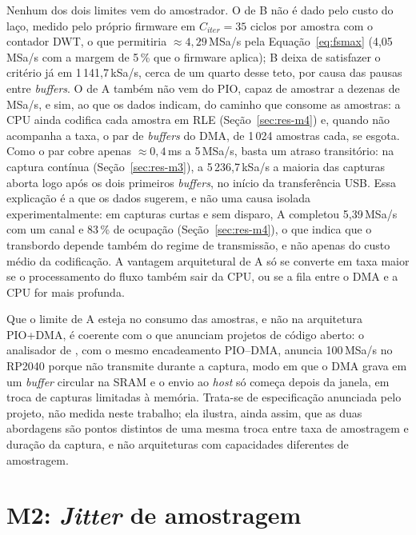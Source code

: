 Nenhum dos dois limites vem do amostrador. O de B não é dado pelo custo do
laço, medido pelo próprio firmware em $C_{iter} = 35$ ciclos por amostra
com o contador \ac{DWT}, o que permitiria $\approx 4{,}29$\,MSa/s pela
Equação~\ref{eq:fsmax} (4,05\,MSa/s com a margem de 5\,\% que o firmware
aplica); B deixa de satisfazer o critério já em 1\,141,7\,kSa/s, cerca de um
quarto desse teto, por causa das pausas entre \emph{buffers}. O de A também
não vem do \ac{PIO}, capaz de amostrar a dezenas de MSa/s, e sim,
ao que os dados indicam, do caminho que consome as amostras: a \ac{CPU} ainda
codifica cada amostra em \ac{RLE} (Seção~\ref{sec:res-m4}) e, quando não
acompanha a taxa, o par de \emph{buffers} do \ac{DMA}, de 1\,024 amostras
cada, se esgota. Como o par cobre apenas $\approx 0{,}4$\,ms a 5\,MSa/s,
basta um atraso transitório: na captura contínua (Seção~\ref{sec:res-m3}), a
5\,236,7\,kSa/s a maioria das capturas aborta logo após os dois primeiros
\emph{buffers}, no início da transferência \ac{USB}. Essa explicação é a que
os dados sugerem, e não uma causa isolada experimentalmente: em capturas
curtas e sem disparo, A completou 5,39\,MSa/s com um canal e 83\,\% de
ocupação (Seção~\ref{sec:res-m4}), o que indica que o transbordo depende
também do regime de transmissão, e não apenas do custo médio da codificação.
A vantagem arquitetural de A só se converte em taxa maior se o processamento
do fluxo também sair da \ac{CPU}, ou se a fila entre o \ac{DMA} e a \ac{CPU}
for mais profunda.

Que o limite de A esteja no consumo das amostras, e não na arquitetura
\ac{PIO}+\ac{DMA}, é coerente com o que anunciam projetos de código aberto: o
analisador de , com o mesmo encadeamento
\ac{PIO}--\ac{DMA}, anuncia 100\,MSa/s no RP2040 porque não transmite durante
a captura, modo em que o \ac{DMA} grava em um \emph{buffer} circular na
\ac{SRAM} e o envio ao \emph{host} só começa depois da janela, em troca de
capturas limitadas à memória. Trata-se de especificação anunciada pelo
projeto, não medida neste trabalho; ela ilustra, ainda assim, que as duas
abordagens são pontos distintos de uma mesma troca entre taxa de amostragem e
duração da captura, e não arquiteturas com capacidades diferentes de
amostragem.

\section{M2: \emph{Jitter} de amostragem}\label{sec:res-m2}

